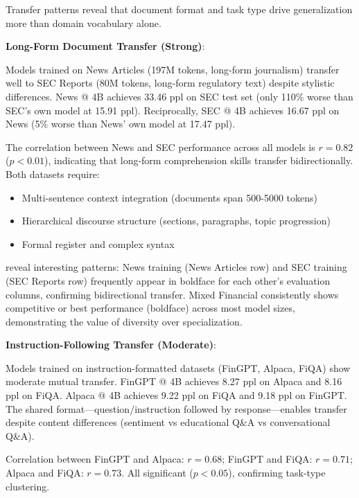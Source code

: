 Transfer patterns reveal that document format and task type drive generalization more than domain vocabulary alone.

\textbf{Long-Form Document Transfer (Strong)}:

Models trained on News Articles (197M tokens, long-form journalism) transfer well to SEC Reports (80M tokens, long-form regulatory text) despite stylistic differences. News @ 4B achieves 33.46 ppl on SEC test set (only 110\% worse than SEC's own model at 15.91 ppl). Reciprocally, SEC @ 4B achieves 16.67 ppl on News (5\% worse than News' own model at 17.47 ppl).

The correlation between News and SEC performance across all models is $r = 0.82$ ($p < 0.01$), indicating that long-form comprehension skills transfer bidirectionally. Both datasets require:
\begin{itemize}
\item Multi-sentence context integration (documents span 500-5000 tokens)
\item Hierarchical discourse structure (sections, paragraphs, topic progression)
\item Formal register and complex syntax
\end{itemize}





 reveal interesting patterns: News training (News Articles row) and SEC training (SEC Reports row) frequently appear in boldface for each other's evaluation columns, confirming bidirectional transfer. Mixed Financial consistently shows competitive or best performance (boldface) across most model sizes, demonstrating the value of diversity over specialization.

\textbf{Instruction-Following Transfer (Moderate)}:

Models trained on instruction-formatted datasets (FinGPT, Alpaca, FiQA) show moderate mutual transfer. FinGPT @ 4B achieves 8.27 ppl on Alpaca and 8.16 ppl on FiQA. Alpaca @ 4B achieves 9.22 ppl on FiQA and 9.18 ppl on FinGPT. The shared format—question/instruction followed by response—enables transfer despite content differences (sentiment vs educational Q\&A vs conversational Q\&A).

Correlation between FinGPT and Alpaca: $r = 0.68$; FinGPT and FiQA: $r = 0.71$; Alpaca and FiQA: $r = 0.73$. All significant ($p < 0.05$), confirming task-type clustering.

